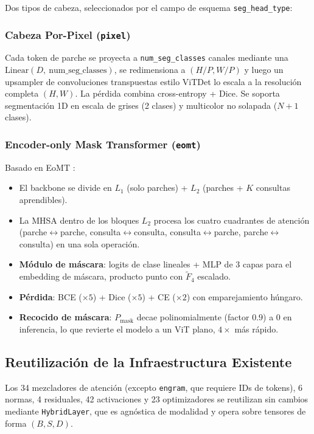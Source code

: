 Dos tipos de cabeza, seleccionados por el campo de esquema \texttt{seg\_head\_type}:

\subsubsection{Cabeza Por-Pixel (\texttt{pixel})}

Cada token de parche se proyecta a \texttt{num\_seg\_classes} canales mediante una $\text{Linear}(D,\allowbreak\ \text{num\_seg\_classes})$, se redimensiona a $(H/P, W/P)$ y luego un upsampler de convoluciones transpuestas estilo ViTDet lo escala a la resolución completa $(H, W)$. La pérdida combina cross-entropy + Dice. Se soporta segmentación 1D en escala de grises (2 clases) y multicolor no solapada ($N+1$ clases).

\subsubsection{Encoder-only Mask Transformer (\texttt{eomt})}

Basado en EoMT \citep{kerssies2025eomt}:
\begin{itemize}[leftmargin=*]
    \item El backbone se divide en $L_1$ (solo parches) + $L_2$ (parches + $K$ consultas aprendibles).
    \item La MHSA dentro de los bloques $L_2$ procesa los cuatro cuadrantes de atención (parche$\leftrightarrow$parche, consulta$\leftrightarrow$consulta, consulta$\leftrightarrow$parche, parche$\leftrightarrow$consulta) en una sola operación.
    \item \textbf{Módulo de máscara}: logits de clase lineales + MLP de 3 capas para el embedding de máscara, producto punto con $\tilde{F}_4$ escalado.
    \item \textbf{Pérdida}: BCE ($\times5$) + Dice ($\times5$) + CE ($\times2$) con emparejamiento húngaro.
    \item \textbf{Recocido de máscara}: $P_\text{mask}$ decae polinomialmente (factor $0.9$) a $0$ en inferencia, lo que revierte el modelo a un ViT plano, $4\times$ más rápido.
\end{itemize}

\subsection{Reutilización de la Infraestructura Existente}

Los 34 mezcladores de atención (excepto \texttt{engram}, que requiere IDs de tokens), 6 normas, 4 residuales, 42 activaciones y 23 optimizadores se reutilizan sin cambios mediante \texttt{HybridLayer}, que es agnóstica de modalidad y opera sobre tensores de forma $(B, S, D)$.

